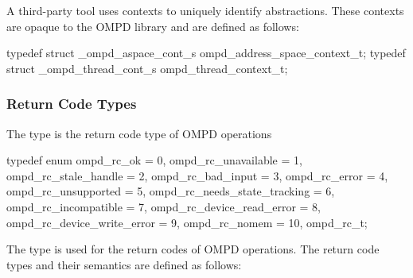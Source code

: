 \summary
A third-party tool uses contexts to uniquely identify abstractions. These 
contexts are opaque to the OMPD library and are defined as follows:

\format
\begin{ccppspecific}
\begin{ompSyntax}
typedef struct _ompd_aspace_cont_s ompd_address_space_context_t;
typedef struct _ompd_thread_cont_s ompd_thread_context_t;
\end{ompSyntax}
\end{ccppspecific}



\subsubsection{Return Code Types}
\label{subsubsec:ompd_rc_t}

\summary
The  type is the return code type of OMPD operations

\format
\begin{ccppspecific}
\begin{ompSyntax}
typedef enum {
  ompd_rc_ok = 0,
  ompd_rc_unavailable = 1,
  ompd_rc_stale_handle = 2,
  ompd_rc_bad_input = 3,
  ompd_rc_error = 4,
  ompd_rc_unsupported = 5,
  ompd_rc_needs_state_tracking = 6,
  ompd_rc_incompatible = 7,
  ompd_rc_device_read_error = 8,
  ompd_rc_device_write_error = 9,
  ompd_rc_nomem = 10,
} ompd_rc_t;
\end{ompSyntax}
\end{ccppspecific}


\descr
The  type is used for the return codes of OMPD operations. 
The return code types and their semantics are defined as follows:

